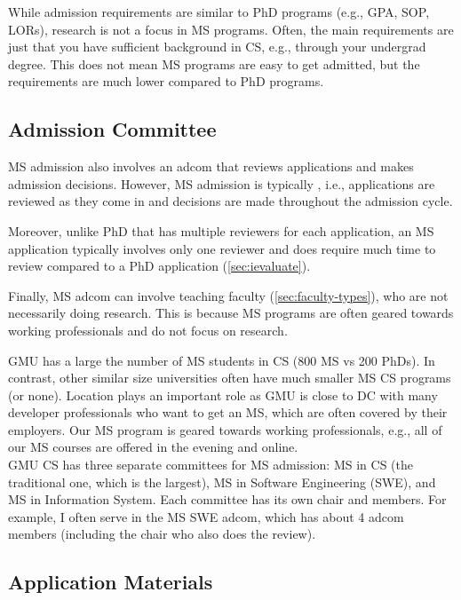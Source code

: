 \documentclass[oneside,11pt]{book}
\newenvironment{commentbox}[1][]{
  \small
  \begin{marker}[\faChessPawn{}]
    {\textbf{#1}}
  }{
  \end{marker}
}
\begin{document}
While admission requirements are similar to PhD programs (e.g., GPA, SOP, LORs), research is not a focus in MS programs. Often, the main requirements are just that you have sufficient background in CS, e.g., through your undergrad degree. This does not mean MS programs are easy to get admitted, but the requirements are much lower compared to PhD programs.

\subsection{Admission Committee}\label{sec:ms-adcom}
MS admission also involves an adcom that reviews applications and makes admission decisions. However, MS admission is typically , i.e., applications are reviewed as they come in and decisions are made throughout the admission cycle.  

Moreover, unlike PhD that has multiple reviewers for each application, an MS application typically involves only one reviewer and does require much time to review compared to a PhD application (\autoref{sec:ievaluate}). 

Finally, MS adcom can involve teaching faculty (\autoref{sec:faculty-types}), who are not necessarily doing research.  This is because MS programs are often geared towards working professionals and do not focus on research.

\begin{commentbox}
    GMU has a large the number of MS students in CS (800 MS vs 200 PhDs). In contrast, other similar size universities often have much smaller MS CS programs (or none). Location plays an important role as GMU is close to DC with many developer professionals who want to get an MS, which are often covered by their employers.  Our MS program is geared towards working professionals, e.g., all of our MS courses are offered in the evening and online.
    \\
    
    GMU CS has three separate committees for MS admission: MS in CS (the traditional one, which is the largest), MS in Software Engineering (SWE), and MS in Information System. 
    Each committee has its own chair and members. For example, I often serve in the MS SWE adcom, which has about 4 adcom members (including the chair who also does the review). 
\end{commentbox}

\subsection{Application Materials}\label{sec:ms-application}
\end{document}
